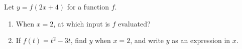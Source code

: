 Let $y=f(2x+4)$ for a function $f$.
\begin{enumerate}
\item[(a)] When $x=2$, at which input is $f$ evaluated?
\item[(b)] If $f(t)=t^2-3t$, find $y$ when $x=2$, and write $y$ as an expression in $x$.
\end{enumerate}
